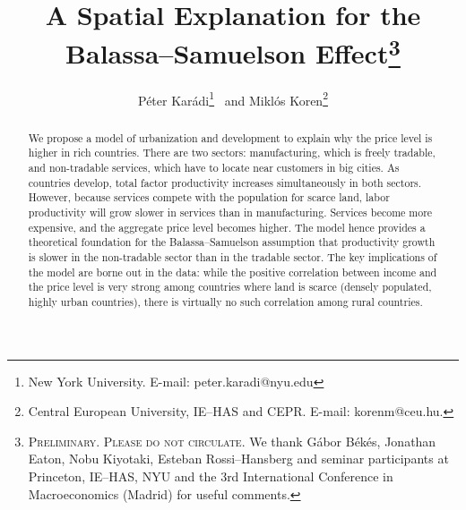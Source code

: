 \documentclass[12pt]{article}
\begin{document}
\title{A Spatial Explanation for the Balassa--Samuelson Effect\thanks{\textsc{Preliminary. Please do not circulate.} We thank G\'abor B\'ek\'es, Jonathan Eaton, Nobu Kiyotaki, Esteban Rossi--Hansberg and seminar participants at Princeton, IE--HAS, NYU and the 3rd International Conference in Macroeconomics (Madrid) for useful comments.}}
\author{P\'eter Kar\'adi\thanks{New York University. E-mail: peter.karadi@nyu.edu}~ and Mikl\'os Koren\thanks{Central European University, IE--HAS and CEPR. E-mail: korenm@ceu.hu.}}
\maketitle

\begin{abstract}
We propose a model of urbanization and development to explain why the price level is higher in rich countries. There are two sectors: manufacturing, which is freely tradable, and non-tradable services, which have to locate near customers in big cities. As countries develop, total factor productivity increases simultaneously in both sectors. However, because services compete with the population for scarce land, labor productivity will grow slower in services than in manufacturing. Services become more expensive, and the aggregate price level becomes higher. The model hence provides a theoretical foundation for the Balassa--Samuelson assumption that productivity growth is slower in the non-tradable sector than in the tradable sector. The key implications of the model are borne out in the data: while the positive correlation between income and the price level is very strong among countries where land is scarce (densely populated, highly urban countries), there is virtually no such correlation among rural countries.
\end{abstract}
\end{document}

